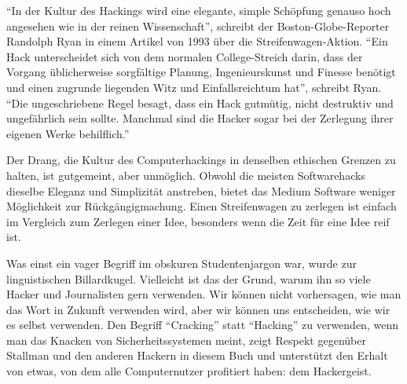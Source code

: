 "`In der Kultur des Hackings wird eine elegante, simple Schöpfung genauso hoch angesehen wie in der reinen Wissenschaft"', schreibt der Boston-Globe-Reporter Randolph Ryan in einem Artikel von 1993 über die Streifenwagen-Aktion. "`Ein Hack unterscheidet sich von dem normalen College-Streich darin, dass der Vorgang üblicherweise sorgfältige Planung, Ingenieurskunst und Finesse benötigt und einen zugrunde liegenden Witz und Einfallsreichtum hat"', schreibt Ryan. "`Die ungeschriebene Regel besagt, dass ein Hack gutmütig, nicht destruktiv und ungefährlich sein sollte. Manchmal sind die Hacker sogar bei der Zerlegung ihrer eigenen Werke behilflich."'

Der Drang, die Kultur des Computerhackings in denselben ethischen Grenzen zu halten, ist gutgemeint, aber unmöglich. Obwohl die meisten Softwarehacks dieselbe Eleganz und Simplizität anstreben, bietet das Medium Software weniger Möglichkeit zur Rückgängigmachung. Einen Streifenwagen zu zerlegen ist einfach im Vergleich zum Zerlegen einer Idee, besonders wenn die Zeit für eine Idee reif ist.

Was einst ein vager Begriff im obskuren Studentenjargon war, wurde zur linguistischen Billardkugel. Vielleicht ist das der Grund, warum ihn so viele Hacker und Journalisten gern verwenden. Wir können nicht vorhersagen, wie man das Wort in Zukunft verwenden wird, aber wir können uns entscheiden, wie wir es selbst verwenden. Den Begriff "`Cracking"' statt "`Hacking"' zu verwenden, wenn man das Knacken von Sicherheitssystemen meint, zeigt Respekt gegenüber Stallman und den anderen Hackern in diesem Buch und unterstützt den Erhalt von etwas, von dem alle Computernutzer profitiert haben: dem Hackergeist.